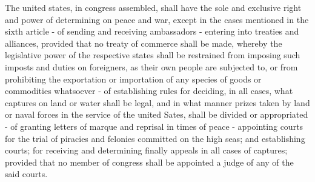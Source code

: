 The united states, in congress assembled, shall have the sole and exclusive right and power of determining on peace and war, except in the cases mentioned in the sixth article - of sending and receiving ambassadors - entering into treaties and alliances, provided that no treaty of commerce shall be made, whereby the legislative power of the respective states shall be restrained from imposing such imposts and duties on foreigners, as their own people are subjected to, or from prohibiting the exportation or importation of any species of goods or commodities whatsoever -  of establishing rules for deciding, in all cases, what captures on land or water shall be legal, and in what manner prizes taken by land or naval forces in the service of the united Sates, shall be divided or appropriated - of granting letters of marque and reprisal in times of peace  -  appointing courts for the trial of piracies and felonies committed on the high seas; and establishing courts; for receiving and determining finally appeals in all cases of captures; provided that no member of congress shall be appointed a judge of any of the said courts.

